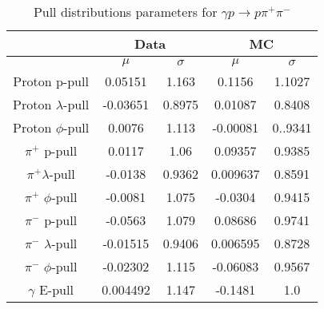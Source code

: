 \begin{table}[h!]
\begin{center}
\caption[Pull distributions parameters for $\gamma p \to p \pi^+\pi^-$]{\label{tab:Pulllpispecs}Pull distributions parameters for $\gamma p \to p \pi^+\pi^-$ \vspace{0.75mm}}

\begin{tabular}{c|c|c||c|c}
\hline
&\multicolumn{2}{c||}{Data} &\multicolumn{2}{c}{MC} \\
\hline
&$\mu$   &$\sigma$ &$\mu$   &$\sigma$\\
\hline
Proton p-pull                            & 0.05151 & 1.163 & 0.1156 & 1.1027\\
\hline
Proton $\lambda$-pull                      & -0.03651 & 0.8975 & 0.01087 & 0.8408  \\
\hline
Proton $\phi$-pull                         & 0.0076 & 1.113 & -0.00081 & 0..9341 \\
\hline
$\pi^{+}$ p-pull        & 0.0117  & 1.06 & 0.09357 & 0.9385\\
\hline
$\pi^{+} \lambda$-pull & -0.0138  & 0.9362 & 0.009637 & 0.8591 \\
\hline
$\pi^{+}$ $\phi$-pull    & -0.0081 & 1.075 & -0.0304 & 0.9415 \\
\hline
$\pi^{-}$ p-pull        & -0.0563  & 1.079 & 0.08686 & 0.9741 \\
\hline
$\pi^{-}$ $\lambda$-pull & -0.01515  & 0.9406  & 0.006595 & 0.8728 \\
\hline
$\pi^{-}$ $\phi$-pull    & -0.02302 & 1.115 & -0.06083 & 0.9567\\
\hline
$\gamma$ E-pull   & 0.004492 & 1.147 & -0.1481 & 1.0 \\
\hline \hline
\end{tabular}
\end{center}
\end{table}